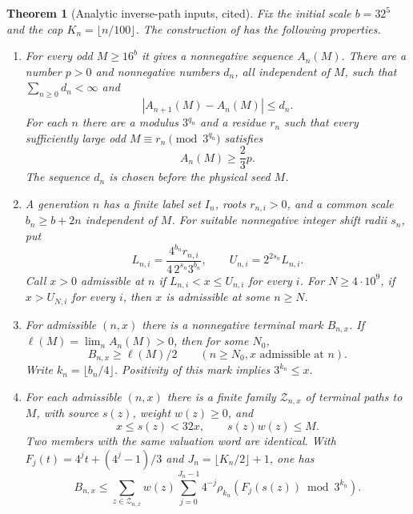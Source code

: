 \documentclass[11pt]{article}
\newtheorem{theorem}{Theorem}
\begin{document}
\begin{theorem}[Analytic inverse-path inputs, cited]\label{thm:input}
Fix the initial scale $b=32^5$ and the cap $K_n=\lfloor n/100\rfloor$.
The construction of \cite{mazur-density} has the following properties.
\begin{enumerate}
\item For every odd $M\ge16^b$ it gives a nonnegative sequence $A_n(M)$.
There are a number $p>0$ and nonnegative numbers $d_n$, all independent
of $M$, such that $\sum_{n\ge0}d_n<\infty$ and
\begin{equation}\label{eq:increments}
 |A_{n+1}(M)-A_n(M)|\le d_n.
\end{equation}
For each $n$ there are a modulus $3^{q_n}$ and a residue $r_n$ such that
every sufficiently large odd $M\equiv r_n\pmod{3^{q_n}}$ satisfies
\begin{equation}\label{eq:activate}
 A_n(M)\ge\frac23p.
\end{equation}
The sequence $d_n$ is chosen before the physical seed $M$.
\item A generation $n$ has a finite label set $I_n$, roots
$r_{n,i}>0$, and a common scale $b_n\ge b+2n$ independent of $M$.
For suitable nonnegative integer shift radii $s_n$, put
\[
 L_{n,i}=\frac{4^{b_n}r_{n,i}}{4\,2^{s_n}3^{b_n}},\qquad
 U_{n,i}=2^{2s_n}L_{n,i}.
\]
Call $x>0$ admissible at $n$ if $L_{n,i}<x\le U_{n,i}$ for every $i$.
For $N\ge4\cdot10^9$, if $x>U_{N,i}$ for every $i$, then $x$ is
admissible at some $n\ge N$.
\item For admissible $(n,x)$ there is a nonnegative terminal mark $B_{n,x}$.
If $\ell(M)=\lim_n A_n(M)>0$, then for some $N_0$,
\begin{equation}\label{eq:mark}
 B_{n,x}\ge\ell(M)/2\qquad(n\ge N_0, x\text{ admissible at }n).
\end{equation}
Write $k_n=\lfloor b_n/4\rfloor$. Positivity of this mark implies
$3^{k_n}\le x$.
\item For each admissible $(n,x)$ there is a finite family $\mathcal Z_{n,x}$
of terminal paths to $M$, with source $s(z)$, weight $w(z)\ge0$, and
\begin{equation}\label{eq:budget}
 x\le s(z)<32x,\qquad s(z)w(z)\le M.
\end{equation}
Two members with the same valuation word are identical. With
$F_j(t)=4^jt+(4^j-1)/3$ and $J_n=\lfloor K_n/2\rfloor+1$, one has
\begin{equation}\label{eq:faninput}
 B_{n,x}\le\sum_{z\in\mathcal Z_{n,x}}w(z)
       \sum_{j=0}^{J_n-1}4^{-j}\rho_{k_n}(F_j(s(z))\bmod3^{k_n}).
\end{equation}
\end{enumerate}
\end{theorem}
\end{document}
